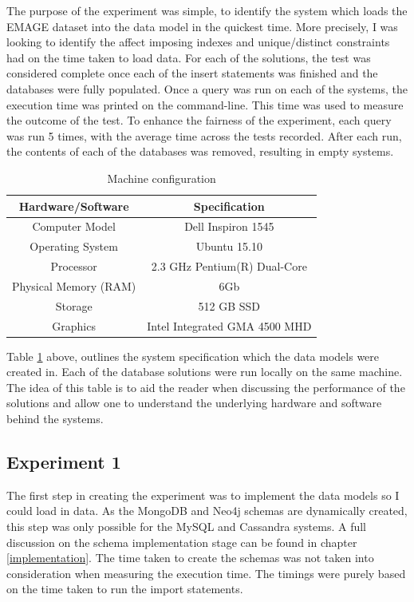 The purpose of the experiment was simple, to identify the system which loads the EMAGE dataset into the data model in the quickest time. More precisely, I was looking to identify the affect imposing indexes and unique/distinct constraints had on the time taken to load data. For each of the solutions, the test was considered complete once each of the insert statements was finished and the databases were fully populated. Once a query was run on each of the systems, the execution time was printed on the command-line. This time was used to measure the outcome of the test. To enhance the fairness of the experiment, each query was run 5 times, with the average time across the tests recorded. After each run, the contents of each of the databases was removed, resulting in empty systems.

\begin{table}[H]
\centering
\begin{tabular}{|c|c|}
\hline
\textbf{Hardware/Software} & \textbf{Specification} \\ \hline
Computer Model & Dell Inspiron 1545 \\ \hline
Operating System & Ubuntu 15.10 \\ \hline
Processor & 2.3 GHz Pentium(R) Dual-Core \\ \hline
Physical Memory (RAM) & 6Gb \\ \hline
Storage & 512 GB SSD \\ \hline
Graphics & Intel Integrated GMA 4500 MHD \\ \hline
\end{tabular}
\caption{Machine configuration}
\label{tab:sysspec}
\end{table}

Table \ref{tab:sysspec} above, outlines the system specification which the data models were created in. Each of the database solutions were run locally on the same machine. The idea of this table is to aid the reader when discussing the performance of the solutions and allow one to understand the underlying hardware and software behind the systems.

\subsection{Experiment 1}\label{experiment1}
The first step in creating the experiment was to implement the data models so I could load in data. As the MongoDB and Neo4j schemas are dynamically created, this step was only possible for the MySQL and Cassandra systems. A full discussion on the schema implementation stage can be found in chapter \ref{implementation}. The time taken to create the schemas was not taken into consideration when measuring the execution time. The timings were purely based on the time taken to run the import statements.

